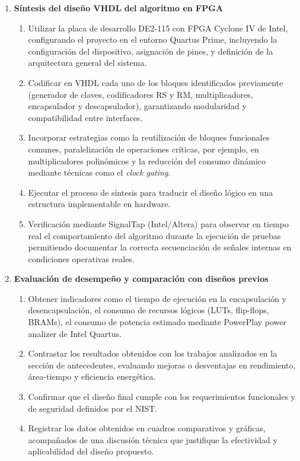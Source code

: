 \begin{enumerate}
\begin{enumerate}[label*=\arabic*.]
    \end{enumerate}



  \item \textbf{Síntesis del diseño VHDL del algoritmo en FPGA}
   \begin{enumerate}[label*=\arabic*.]
     \item Utilizar la placa de desarrollo DE2-115 con FPGA Cyclone IV de Intel, configurando el proyecto en el entorno Quartus Prime, incluyendo la configuración del dispositivo, asignación de pines, y definición de la arquitectura general del sistema.
     \item Codificar en VHDL cada uno de los bloques identificados previamente (generador de claves, codificadores RS y RM, multiplicadores, encapsulador y descapsulador), garantizando modularidad y compatibilidad entre interfaces.
     \item Incorporar estrategias como la reutilización de bloques funcionales comunes, paralelización de operaciones críticas, por ejemplo, en multiplicadores polinómicos y la reducción del consumo dinámico mediante técnicas como el \textit{clock gating}.
     \item Ejecutar el proceso de síntesis para traducir el diseño lógico en una estructura implementable en hardware.
     \item Verificación mediante SignalTap (Intel/Altera) para observar en tiempo real el comportamiento del algoritmo durante la ejecución de pruebas permitiendo documentar la correcta secuenciación de señales internas en condiciones operativas reales.
  \end{enumerate}


  \item \textbf{Evaluación de desempeño y comparación con diseños previos}
    \begin{enumerate}[label*=\arabic*.]
      \item Obtener indicadores como el tiempo de ejecución en la encapsulación y desencapsulación, el consumo de recursos lógicos (LUTs, flip-flops, BRAMs), el consumo de potencia estimado mediante PowerPlay power analizer de Intel Quartus.
      \item Contrastar los resultados obtenidos con los trabajos analizados en la sección de antecedentes, evaluando mejoras o desventajas en rendimiento, área-tiempo y eficiencia energética.
      \item Confirmar que el diseño final cumple con los requerimientos funcionales y de seguridad definidos por el NIST.
      \item Registrar los datos obtenidos en cuadros comparativos y gráficas, acompañados de una discusión técnica que justifique la efectividad y aplicabilidad del diseño propuesto.
    \end{enumerate}
\end{enumerate}


